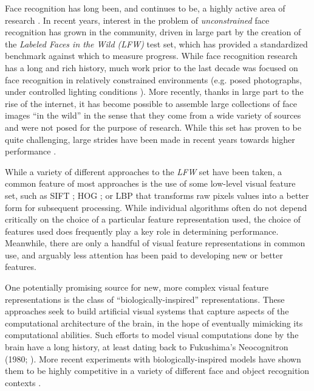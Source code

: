 Face recognition has long been, and continues to be, a highly active area of research \cite{belhumeur2002eigenfaces,yang2002kernel,vasilescu2002multilinear,zhao2003face,he2005face,hua2007face,hua2009robust,guillaumin2009you,hua2009robust,wright2009implicit,zou2007comparative}.
In recent years, interest in the problem of \emph{unconstrained} face
recognition has grown in the community, driven in large part by the creation of
the \emph{Labeled Faces in the Wild (LFW)} \cite{huang:lfw} test set, which has
provided a standardized benchmark against which to measure progress.  While
face recognition research  has a long and rich history, much
work prior to the last decade was focused on face recognition in relatively
constrained environments (e.g. posed photographs, under controlled  lighting
conditions \cite{orl,yale,cvl,ar,phillips2000feret,gross2009multi}).  More
recently, thanks in large part to the rise of the internet, it has become
possible to assemble large collections of face images ``in the wild'' in the
sense that they come from a wide variety of sources and were not posed for the
purpose of research.  While this set has proven to be quite challenging, large
strides have been made in recent years towards higher performance
\cite{pinto:eccv08,pinto:cvpr09,taigman:bmvc09,wolf:accv09,kumar:iccv09,cao2010face}.

While a variety of different approaches to the \emph{LFW} set have been taken,
a common feature of most approaches is the use of some low-level visual feature
set, such as SIFT \cite{sift,luo2007person}; HOG
\cite{dalal2005hog,albiol2008face}; or LBP
\cite{ahonen2004face,ahonen2006face} that transforms raw pixels values into a
better form for subsequent processing.  While individual algorithms often do
not depend critically on the choice of a particular feature representation
used, the choice of features used does frequently play a key role in
determining performance.  Meanwhile, there are only a handful of visual feature
representations in common use, and arguably less attention has been paid to
developing new or better features.

One potentially promising source for new, more complex visual feature representations is the
class of ``biologically-inspired'' representations.
These approaches seek to build artificial visual 
systems that capture aspects of the computational architecture of the brain, in the hope of
eventually mimicking its computational abilities. Such efforts to model visual
computations done by the brain have a long history, at least dating back to
Fukushima's Neocognitron (1980; \cite{fukushima1980neocognitron}).  More recent
experiments with biologically-inspired models have shown them to be highly
competitive in a variety of different face and object recognition
contexts \cite{serre2007ror,mutch2008ocr,pinto:plos08,pinto:eccv08,jarrett-iccv-09}.

